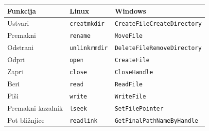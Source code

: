 \documentclass[a4paper,12pt,openright]{book}
\begin{document}
\begin{table}[h!]
	\begin{center}
		\begin{tabular}{ p{3.7cm}|p{2.5cm}|p{6cm} }
			Funkcija           & Linux                                                                                          & Windows                                                           \\
			\hline
			Ustvari            & \verb|creat|\newline\verb|mkdir|                                                               & \verb|CreateFile|\newline\verb|CreateDirectory|                   \\
			Premakni           & \verb|rename|                                                                                  & \verb|MoveFile|                                                   \\
			Odstrani           & \verb|unlink|\newline\verb|rmdir|                                                              & \verb|DeleteFile|\newline\verb|RemoveDirectory|                   \\
			Odpri              & \verb|open|                                                                                    & \verb|CreateFile|                                                 \\
			Zapri              & \verb|close|                                                                                   & \verb|CloseHandle|                                                \\
			Beri               & \verb|read|                                                                                    & \verb|ReadFile|                                                   \\
			Piši              & \verb|write|                                                                                   & \verb|WriteFile|                                                  \\
			Premakni kazalnik  & \verb|lseek|                                                                                   & \verb|SetFilePointer|                                             \\
			Pot bližnjice     & \verb|readlink|                                                                                & \verb|GetFinalPathNameByHandle|                                   \\

\end{tabular}
\end{center}
\end{table}
\end{document}
